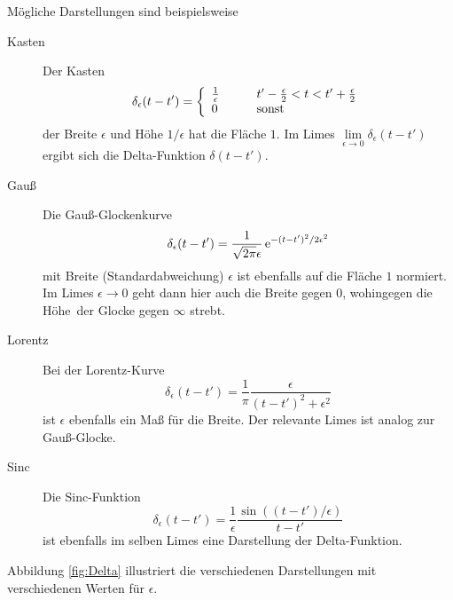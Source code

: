 \documentclass[paper=a4, fontsize=11.0pt, abstractoff, DIV12]{scrartcl}
\begin{document}
Mögliche Darstellungen sind beispielsweise
\begin{description}
    \item[Kasten] Der \glqq Kasten\grqq~
    \begin{equation}
    \delta_\epsilon(t-t') = \left\{\begin{array}{l l}\frac{1}{\epsilon} & \qquad t'-\frac{\epsilon}{2} < t < t'+\frac{\epsilon}{2}\\ 0 &\qquad\mathrm{sonst}\end{array}\right.
    \end{equation}
    der Breite $\epsilon$ und Höhe $1/\epsilon$ hat die Fläche $1$. Im Limes
    $\lim\limits_{\epsilon\to0}\delta_\epsilon(t-t')$ ergibt sich die
    Delta-Funktion $\delta(t-t')$.

    \item[Gauß] Die Gauß-Glockenkurve
    \begin{equation}
    \delta_\epsilon(t-t') = \frac{1}{\sqrt{2\pi}\epsilon} \,{\mathrm{e}}^{-(t-t')^2/2\epsilon^2}
    \end{equation}
    mit Breite (Standardabweichung) $\epsilon$ ist ebenfalls auf die Fläche
    $1$ normiert. Im Limes $\epsilon \to 0$ geht dann hier auch die Breite
    gegen $0$, wohingegen die \glqq Höhe\grqq~der Glocke gegen $\infty$
    strebt.
    \item[Lorentz] Bei der Lorentz-Kurve
    \begin{equation}
    \delta_\epsilon(t-t') = \frac{1}{\pi}\frac{\epsilon}{(t-t')^2 + \epsilon^2}
    \end{equation}
    ist $\epsilon$ ebenfalls ein Maß für die Breite. Der relevante Limes ist
    analog zur Gauß-Glocke.
    \item[Sinc] Die Sinc-Funktion
    \begin{equation}
    \delta_\epsilon(t-t') = \frac{1}{\epsilon} \frac{\sin((t-t')/\epsilon)}{t-t'}
    \end{equation}
    ist ebenfalls im selben Limes eine Darstellung der Delta-Funktion.
\end{description}
Abbildung \ref{fig:Delta} illustriert die verschiedenen Darstellungen mit
verschiedenen Werten für $\epsilon$.
\begin{figure*}[!htb]
    \centering
    
    \caption{Von links nach rechts sind an verschiedenen Zeiten $t'$
    lokalisierte Kasten-, \mbox{Gauß-,} Lorentz- und Sinc-Darstellungen
    $\delta_\epsilon(t-t')$ der Delta-Funktion $\delta(t-t')$ geplottet.}
    \label{fig:Delta}
\end{figure*}
\end{document}
